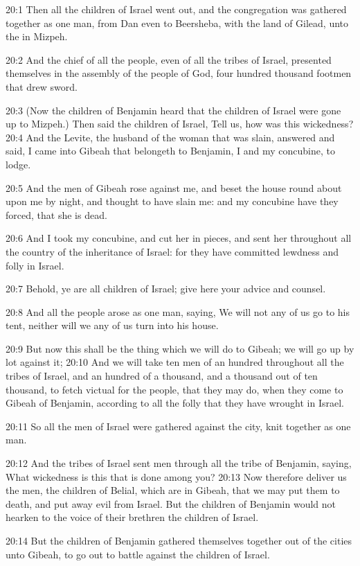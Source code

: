 20:1 Then all the children of Israel went out, and the congregation was gathered together as one man, from Dan even to Beersheba, with the land of Gilead, unto the \LORD in Mizpeh.

20:2 And the chief of all the people, even of all the tribes of Israel, presented themselves in the assembly of the people of God, four hundred thousand footmen that drew sword.

20:3 (Now the children of Benjamin heard that the children of Israel were gone up to Mizpeh.) Then said the children of Israel, Tell us, how was this wickedness?  20:4 And the Levite, the husband of the woman that was slain, answered and said, I came into Gibeah that belongeth to Benjamin, I and my concubine, to lodge.

20:5 And the men of Gibeah rose against me, and beset the house round about upon me by night, and thought to have slain me: and my concubine have they forced, that she is dead.

20:6 And I took my concubine, and cut her in pieces, and sent her throughout all the country of the inheritance of Israel: for they have committed lewdness and folly in Israel.

20:7 Behold, ye are all children of Israel; give here your advice and counsel.

20:8 And all the people arose as one man, saying, We will not any of us go to his tent, neither will we any of us turn into his house.

20:9 But now this shall be the thing which we will do to Gibeah; we will go up by lot against it; 20:10 And we will take ten men of an hundred throughout all the tribes of Israel, and an hundred of a thousand, and a thousand out of ten thousand, to fetch victual for the people, that they may do, when they come to Gibeah of Benjamin, according to all the folly that they have wrought in Israel.

20:11 So all the men of Israel were gathered against the city, knit together as one man.

20:12 And the tribes of Israel sent men through all the tribe of Benjamin, saying, What wickedness is this that is done among you?  20:13 Now therefore deliver us the men, the children of Belial, which are in Gibeah, that we may put them to death, and put away evil from Israel. But the children of Benjamin would not hearken to the voice of their brethren the children of Israel.

20:14 But the children of Benjamin gathered themselves together out of the cities unto Gibeah, to go out to battle against the children of Israel.

